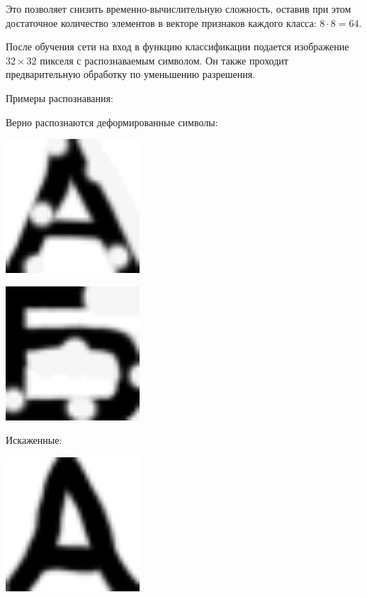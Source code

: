 Это позволяет снизить временно-вычислительную сложность, оставив при этом достаточное количество элементов в векторе признаков каждого класса: $8 \cdot 8 = 64$.

После обучения сети на вход в функцию классификации подается изображение $32\times 32$ пикселя с распознаваемым символом. Он также проходит предварительную обработку по уменьшению разрешения.

Примеры распознавания:

Верно распознаются деформированные символы:
\begin{center}
	\includegraphics[width=5cm]{image_for_report/sample_a.bmp}
\end{center}
\begin{center}
	\includegraphics[width=5cm]{image_for_report/sample_b_2.bmp}
\end{center}

Искаженные:
\begin{center}
	\includegraphics[width=5cm]{image_for_report/sample_a_2.bmp}
\end{center}

